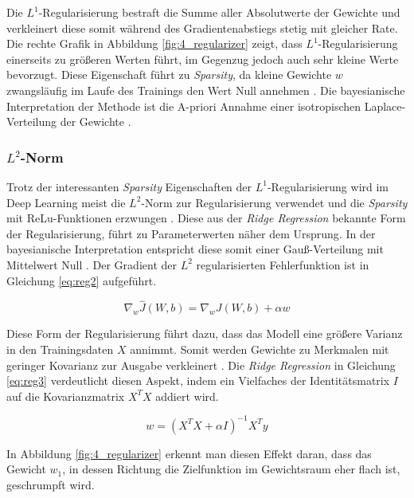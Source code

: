 Die $L^1$-Regu\-lari\-sierung bestraft die Summe aller Absolutwerte der Gewichte und verkleinert diese somit  während des Gradientenabstiegs stetig mit gleicher Rate. Die rechte Grafik in Abbildung \ref{fig:4_regularizer} zeigt, dass $L^1$-Regu\-lari\-sierung einerseits zu größeren Werten führt, im Gegenzug jedoch auch sehr kleine Werte bevorzugt. Diese Eigenschaft führt zu \textit{Sparsity}, da kleine Gewichte $w$ zwangsläufig im Laufe des Trainings den Wert Null annehmen \cite[vgl.][Kap. 7.2, S. 203]{Bengio2015}.
Die bayesianische Interpretation der Methode ist die A-priori Annahme einer isotropischen Laplace-Verteilung der Gewichte \cite[vgl.][Kap. 7.2, S. 206]{Bengio2015}.

\subsubsection{$L^2$-Norm}
\label{ch:l1_l2}
Trotz der interessanten \textit{Sparsity} Eigenschaften der $L^1$-Regularisierung wird im Deep Learning meist die $L^2$-Norm zur Regularisierung  verwendet und die \textit{Sparsity} mit ReLu-Funktionen erzwungen \cite[vgl. z.B.][]{Krizhevsky2012}.
Diese aus der \textit{Ridge Regression} bekannte Form der Regularisierung, führt zu Parameterwerten näher dem Ursprung. In der bayesianische Interpretation entspricht diese somit einer Gauß-Verteilung mit Mittelwert Null \cite[vgl.][Kap. 7.2, S. 200]{Bengio2015}. Der Gradient der $L^2$ regularisierten Fehlerfunktion ist in Gleichung \ref{eq:reg2} aufgeführt.

\begin{equation}
\label{eq:reg2}
\nabla_w \hat{J}(W,b) = \nabla_w J(W,b) + \alpha w
\end{equation}

Diese Form der Regularisierung führt dazu, dass das Modell eine größere Varianz in den Trainingsdaten $X$ annimmt. Somit werden Gewichte zu Merkmalen mit geringer Kovarianz zur Ausgabe verkleinert \cite[vgl.][Kap. 7.2, S. 200 f.]{Bengio2015}. Die \textit{Ridge Regression} in Gleichung \ref{eq:reg3} verdeutlicht diesen Aspekt, indem ein Vielfaches der Identitätsmatrix $I$ auf die Kovarianzmatrix $X^TX$ addiert wird.

\begin{equation}
\label{eq:reg3}
w = (X^TX + \alpha I)^{-1} X^Ty
\end{equation}


In Abbildung \ref{fig:4_regularizer} erkennt man diesen Effekt daran, dass das Gewicht $w_1$, in dessen Richtung die Zielfunktion im Gewichtsraum eher flach ist, geschrumpft wird.

